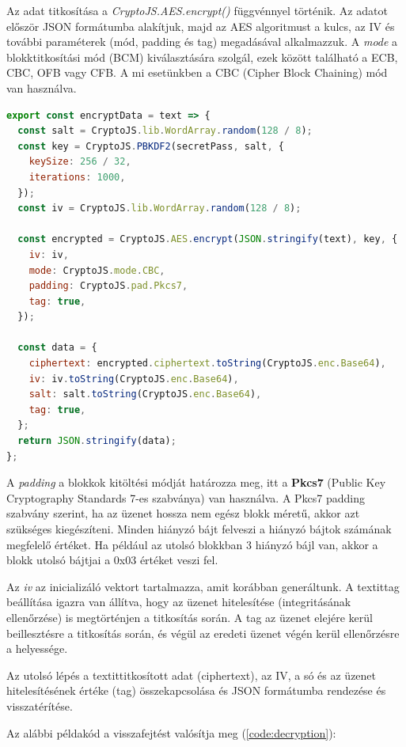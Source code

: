 Az adat titkosítása a \textit{CryptoJS.AES.encrypt()} függvénnyel történik. Az adatot először JSON formátumba alakítjuk, majd az AES algoritmust a kulcs, az IV és további paraméterek (mód, padding és tag) megadásával alkalmazzuk. A \textit{mode} a blokktitkosítási mód (BCM) kiválasztására szolgál, ezek között található a ECB, CBC, OFB vagy CFB. A mi esetünkben a CBC (Cipher Block Chaining) mód van használva.

\begin{lstlisting}[caption={Titkosítás példakód.}, captionpos=b, language = JavaScript, label={code:encryption}]
export const encryptData = text => {
  const salt = CryptoJS.lib.WordArray.random(128 / 8);
  const key = CryptoJS.PBKDF2(secretPass, salt, {
    keySize: 256 / 32,
    iterations: 1000,
  });
  const iv = CryptoJS.lib.WordArray.random(128 / 8);

  const encrypted = CryptoJS.AES.encrypt(JSON.stringify(text), key, {
    iv: iv,
    mode: CryptoJS.mode.CBC,
    padding: CryptoJS.pad.Pkcs7,
    tag: true,
  });

  const data = {
    ciphertext: encrypted.ciphertext.toString(CryptoJS.enc.Base64),
    iv: iv.toString(CryptoJS.enc.Base64),
    salt: salt.toString(CryptoJS.enc.Base64),
    tag: true,
  };
  return JSON.stringify(data);
};
\end{lstlisting}

A \textit{padding} a blokkok kitöltési módját határozza meg, itt a \textbf{Pkcs7} (Public Key Cryptography Standards 7-es szabványa) van használva. A Pkcs7 padding szabvány szerint, ha az üzenet hossza nem egész blokk méretű, akkor azt szükséges kiegészíteni. Minden hiányzó bájt felveszi a hiányzó bájtok számának megfelelő értéket. Ha például az utolsó blokkban 3 hiányzó bájl van, akkor a blokk utolsó bájtjai a 0x03 értéket veszi fel.

Az \textit{iv} az inicializáló vektort tartalmazza, amit korábban generáltunk. A textit{tag} beállítása igazra van állítva, hogy az üzenet hitelesítése (integritásának ellenőrzése) is megtörténjen a titkosítás során. A tag az üzenet elejére kerül beillesztésre a titkosítás során, és végül az eredeti üzenet végén kerül ellenőrzésre a helyessége.

Az utolsó lépés a textit{titkosított adat (ciphertext)}, az IV, a só és az üzenet hitelesítésének értéke (tag) összekapcsolása és JSON formátumba rendezése és visszatérítése.

Az alábbi példakód a visszafejtést valósítja meg (\ref{code:decryption}):

